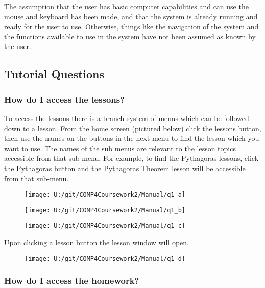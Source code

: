 The assumption that the user has basic computer capabilities and can use the mouse and keyboard has been made, and that the system is already running and ready for the user to use. Otherwise, things like the navigation of the system and the functions available to use in the system have not been assumed as known by the user.

\subsection{Tutorial Questions}

\subsubsection{How do I access the lessons?}

To access the lessons there is a branch system of menus which can be followed down to a lesson. From the home screen (pictured below) click the lessons button, then use the names on the buttons in the next menu to find the lesson which you want to use. The names of the sub menus are relevant to the lesson topics accessible from that sub menu. For example, to find the Pythagoras lessons, click the Pythagoras button and the Pythagoras Theorem lesson will be accessible from that sub-menu.

\begin{figure}[H]
    \texttt{[image: U:/git/COMP4Coursework2/Manual/q1\_a]}
\end{figure}

\begin{figure}[H]
    \texttt{[image: U:/git/COMP4Coursework2/Manual/q1\_b]}
\end{figure}

\begin{figure}[H]
    \texttt{[image: U:/git/COMP4Coursework2/Manual/q1\_c]}
\end{figure}

Upon clicking a lesson button the lesson window will open.

\begin{figure}[H]
    \texttt{[image: U:/git/COMP4Coursework2/Manual/q1\_d]}
\end{figure}

\subsubsection{How do I access the homework?}


